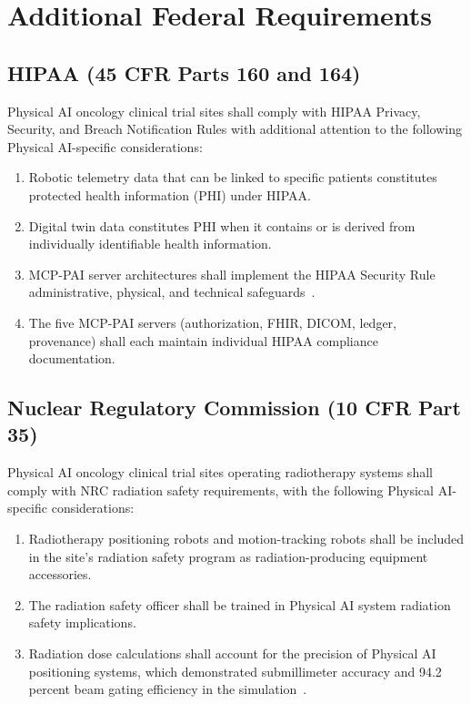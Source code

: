 \section{Additional Federal Requirements}

\subsection{HIPAA (45 CFR Parts 160 and 164)}

Physical AI oncology clinical trial sites shall comply with HIPAA Privacy,
Security, and Breach Notification Rules with additional attention to the
following Physical AI-specific considerations:

\begin{enumerate}[label=(\alph*)]
\item Robotic telemetry data that can be linked to specific patients
  constitutes protected health information (PHI) under HIPAA.
\item Digital twin data constitutes PHI when it contains or is derived from
  individually identifiable health information.
\item MCP-PAI server architectures shall implement the HIPAA Security Rule
  administrative, physical, and technical safeguards~\cite{iche6r3adapt}.
\item The five MCP-PAI servers (authorization, FHIR, DICOM, ledger,
  provenance) shall each maintain individual HIPAA compliance
  documentation.
\end{enumerate}

\subsection{Nuclear Regulatory Commission (10 CFR Part 35)}

Physical AI oncology clinical trial sites operating radiotherapy systems
shall comply with NRC radiation safety requirements, with the following
Physical AI-specific considerations:

\begin{enumerate}[label=(\alph*)]
\item Radiotherapy positioning robots and motion-tracking robots shall be
  included in the site's radiation safety program as radiation-producing
  equipment accessories.
\item The radiation safety officer shall be trained in Physical AI system
  radiation safety implications.
\item Radiation dose calculations shall account for the precision of Physical
  AI positioning systems, which demonstrated submillimeter accuracy and 94.2
  percent beam gating efficiency in the
  simulation~\cite{newtrial2026}.
\end{enumerate}

